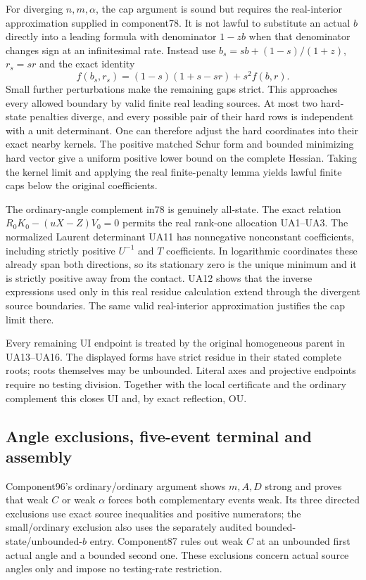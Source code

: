 For diverging $n,m,\alpha$, the cap argument is sound but requires
the real-interior approximation supplied in component78. It is not
lawful to substitute an actual $b$ directly into a leading formula
with denominator $1-zb$ when that denominator changes sign at an
infinitesimal rate. Instead use
$b_s=sb+(1-s)/(1+z)$, $r_s=sr$ and the exact identity
\[
 f(b_s,r_s)=(1-s)(1+s-sr)+s^2f(b,r).
\]
Small further perturbations make the remaining gaps strict. This
approaches every allowed boundary by valid finite real leading
sources. At most two hard-state penalties diverge, and every possible
pair of their hard rows is independent with a unit determinant.
One can therefore adjust the hard coordinates into their exact
nearby kernels. The positive matched Schur form and bounded minimizing
hard vector give a uniform positive lower bound on the complete
Hessian. Taking the kernel limit and applying the real finite-penalty
lemma yields lawful finite caps below the original coefficients.

The ordinary-angle complement in78 is genuinely all-state. The
exact relation $R_0K_0-(uX-Z)V_0=0$ permits the real rank-one
allocation UA1--UA3. The normalized Laurent determinant UA11 has
nonnegative nonconstant coefficients, including strictly positive
$U^{-1}$ and $T$ coefficients. In logarithmic coordinates these
already span both directions, so its stationary zero is the unique
minimum and it is strictly positive away from the contact. UA12
shows that the inverse expressions used only in this real residue
calculation extend through the divergent source boundaries. The
same valid real-interior approximation justifies the cap limit there.

Every remaining UI endpoint is treated by the original homogeneous
parent in UA13--UA16. The displayed forms have strict residue in
their stated complete roots; roots themselves may be unbounded.
Literal axes and projective endpoints require no testing division.
Together with the local certificate and the ordinary complement this
closes UI and, by exact reflection, OU.

\subsection{Angle exclusions, five-event terminal and assembly}

Component96's ordinary/ordinary argument shows $m,A,D$ strong and
proves that weak $C$ or weak $\alpha$ forces both complementary
events weak. Its three directed exclusions use exact source
inequalities and positive numerators; the small/ordinary exclusion
also uses the separately audited bounded-state/unbounded-$b$ entry.
Component87 rules out weak $C$ at an unbounded first actual angle
and a bounded second one. These exclusions concern actual source
angles only and impose no testing-rate restriction.

